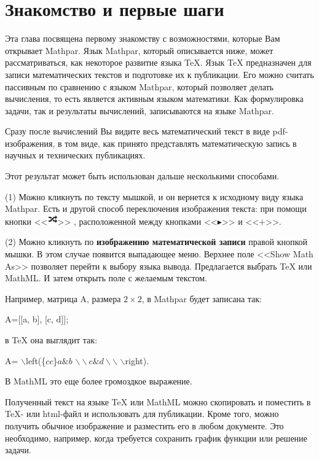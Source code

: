 \chapter{Знакомство и первые шаги}
Эта глава посвящена первому знакомству с возможностями, которые Вам открывает Mathpar.
Язык Mathpar, который описывается ниже, может рассматриваться, как некоторое развитие языка TeX.
Язык TeX предназначен для записи математических текстов и подготовке их к публикации.
Его можно считать пассивным по сравнению с языком Mathpar, который позволяет делать вычисления,
то есть является активным языком математики. Как формулировка задачи,
так и результаты вычислений, записываются на языке Mathpar.

Сразу после вычислений Вы видите весь математический текст в виде pdf-изображения,
в том виде, как принято представлять математическую запись в научных и технических публикациях.

Этот результат может быть использован дальше несколькими способами.
 
(1) Можно кликнуть по тексту мышкой, и он вернется к исходному виду языка Mathpar.
Есть и другой способ переключения изображения текста: при помощи кнопки%
<<\includegraphics[scale=0.6]{pictures/button_arrows.png}>>%
, расположенной между кнопками <<$\blacktriangleright$>> и <<$+$>>.

(2) Можно кликнуть по {\bf изображению математической записи} правой кнопкой мышки.
В этом случае появится выпадающее меню. Верхнее поле <<Show Math As>> позволяет
перейти к выбору  языка вывода. Предлагается выбрать TeX или MathML.
И затем открыть поле с желаемым текстом.

Например, матрица A, размера $2\times 2$, в Mathpar будет записана так:

A=[[a, b], [c, d]];

в TeX она выглядит так:

A= $\backslash$left(\{${cc}$\}$ a \& b$ $\backslash\backslash c \& d \backslash\backslash$ $\backslash$right).

В MathML это еще более громоздкое выражение.
 
Полученный текст на языке TeX или MathML можно скопировать и поместить  в TeX- 
или html-файл и использовать для публикации. Кроме того, можно получить обычное 
изображение и разместить его в любом документе. Это необходимо, например, 
когда требуется сохранить график функции или решение задачи.


